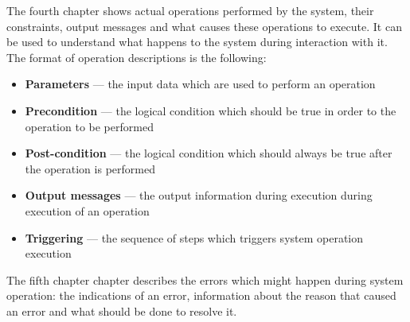 The fourth chapter shows actual operations performed by the system, their
constraints, output messages and what causes these operations to execute. It can
be used to understand what happens to the system during interaction with it. The
format of operation descriptions is the following:
\begin{itemize}
  \item \textbf{Parameters} --- the input data which are used to perform an
  operation
  \item \textbf{Precondition} --- the logical condition which should be true in
  order to the operation to be performed
  \item \textbf{Post-condition} --- the logical condition which should always be
  true after the operation is performed
  \item \textbf{Output messages} --- the output information during execution
  during execution of an operation
  \item \textbf{Triggering} --- the sequence of steps which triggers system
  operation execution
\end{itemize}

The fifth chapter chapter describes the  errors which might happen during system
operation: the indications of an error, information about the reason that caused
an error and what should be done to resolve it.
